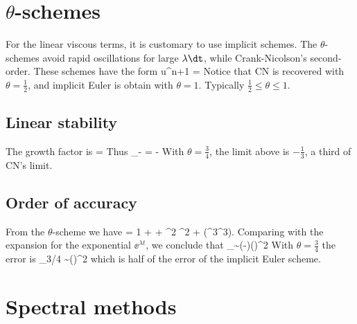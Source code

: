 \documentclass[11pt]{article}
\begin{document}

\section{$\theta$-schemes}
For the linear viscous terms, it is customary to use implicit schemes. The $\theta$-schemes avoid rapid oscillations for large $\lambda \dt$, while Crank-Nicolson's second-order. These schemes have the form
\beq
\label{eq:th_schemes}
u^{n+1} = \per
\eeq
Notice that CN  is recovered with $\theta = \tfrac{1}{2}$, and implicit Euler is obtain with $\theta = 1$. Typically $\tfrac{1}{2}\leq\theta\leq 1$. 

\subsection*{Linear stability}
The growth factor is
\beq
\label{eq:lin_stab_th}
\sigma =  \per
\eeq
Thus
\beq
\lim_{\lambda\dt\to-\infty} \sigma = -  \per
\eeq
With $\theta = \tfrac{3}{4}$, the limit above is $-\tfrac{1}{3}$, a third of CN's limit. 

\subsection*{Order of accuracy}
From the $\theta$-scheme we have
\beq
{} = 1 + \lambda\dt + \theta \lambda^2 \dt^2 + (\lambda^3\dt^3).
\eeq
Comparing with the expansion for the exponential $\ee^{\lambda t}$, we conclude that
\beq
{}_\theta \sim \left(-\theta\right)(\lambda \dt)^2\per 
\eeq
With $\theta = \tfrac{3}{4}$ the error is
\beq
{}_{3/4} \sim {}(\lambda \dt)^2\com
\eeq
which is half of the error of the implicit Euler scheme.

\section{Spectral methods}
\end{document}
